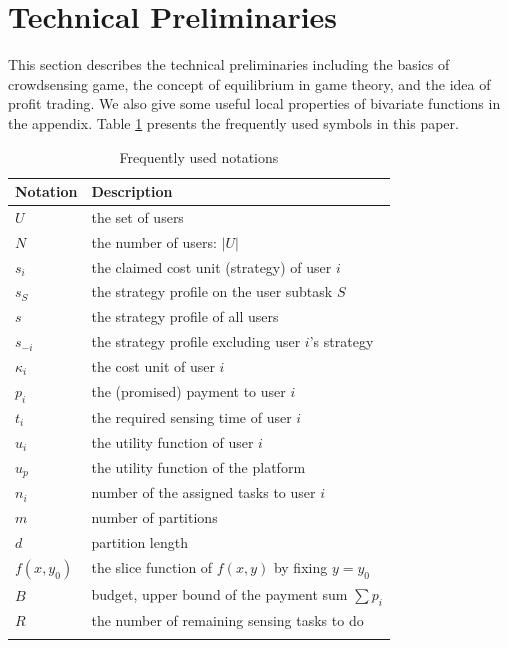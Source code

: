 \documentclass[conference]{IEEEtran}
\theoremstyle{definition}
\begin{document}
\section{Technical Preliminaries}
\label{sec:TP}
This section describes the technical preliminaries including the basics of crowdsensing game, the concept of equilibrium in game theory, and the idea of profit trading. We also give some useful local properties of bivariate functions in the appendix. Table \ref{tab:symbol_list} presents the frequently used symbols in this paper.
\begin{table}[!t]
\caption{Frequently used notations}
\label{tab:symbol_list}
\begin{tabular}{l l}
\toprule
Notation & Description\\
\hline
$U$ & the set of users\\
$N$ & the number of users: $|U|$ \\
$s_i$ & the claimed cost unit (strategy) of user $i$\\
$s_S$ & the strategy profile on the user subtask $S$\\
$s$ & the strategy profile of all users \footnotemark[1]\\
$s_{-i}$ & the strategy profile excluding user $i$'s strategy\\
$\kappa_i$ & the cost unit of user $i$\\
$p_i$ & the (promised) payment to user $i$\\
$t_i$ & the required sensing time of user $i$\\
$u_i$ & the utility function of user $i$\\
$u_p$ & the utility function of the platform\\
$n_i$ & number of the assigned tasks to user $i$\\
$m$	& number of partitions\\
$d$ & partition length\\
$f(x, y_0)$ & the slice function of $f(x,y)$ by fixing $y = y_0$\\
$B$ & budget, upper bound of the payment sum $\sum p_i$\\
$R$ & the number of remaining sensing tasks to do\\
\bottomrule
\smallskip
\end{tabular}
\end{table}
\addtocounter{footnote}{1}
\end{document}
